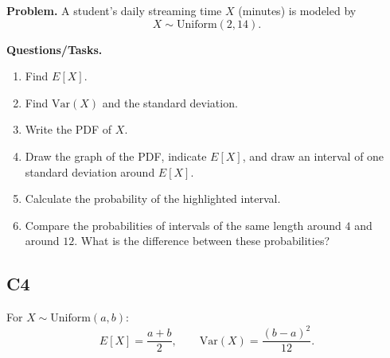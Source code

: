\textbf{Problem.}
A student's daily streaming time \(X\) (minutes) is modeled by
\[
X\sim \text{Uniform}(2,14).
\]

\textbf{Questions/Tasks.}
\begin{enumerate}[label=\textbf{\alph*)}]
	\item Find \(E[X]\).
	\item Find \(\mathrm{Var}(X)\) and the standard deviation.
	\item Write the PDF of \(X\).
	\item Draw the graph of the PDF, indicate \(E[X]\), and draw an interval of one standard deviation around \(E[X]\).
	\item Calculate the probability of the highlighted interval.
	\item Compare the probabilities of intervals of the same length around \(4\) and around \(12\). What is the difference between these probabilities?
\end{enumerate}

\subsection*{C4}
For \(X\sim\text{Uniform}(a,b)\):
\[
E[X]=\frac{a+b}{2},\qquad \mathrm{Var}(X)=\frac{(b-a)^2}{12}.
\]

